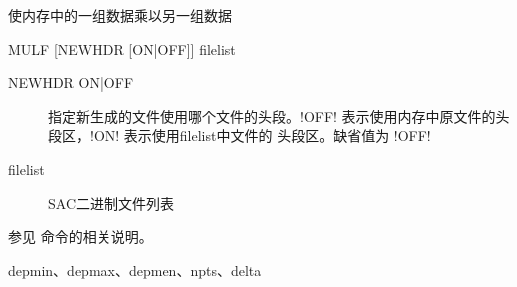 \label{cmd:mulf}

使内存中的一组数据乘以另一组数据

\begin{SACSTX}
MULF [NEWHDR [ON|OFF]] filelist
\end{SACSTX}

\begin{description}
\item [NEWHDR ON|OFF] 指定新生成的文件使用哪个文件的头段。!OFF!
    表示使用内存中原文件的头段区，!ON! 表示使用filelist中文件的
    头段区。缺省值为 !OFF!
\item [filelist] SAC二进制文件列表
\end{description}

参见  命令的相关说明。

depmin、depmax、depmen、npts、delta
